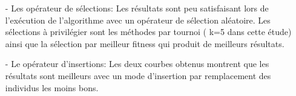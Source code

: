 \documentclass{article}
\begin{document}
\begin{itemize}
\item[-] Les  opérateur de sélections:
Les résultats sont peu satisfaisant lors de l'exécution de l'algorithme avec un opérateur de sélection aléatoire. Les sélections à privilégier sont les méthodes par tournoi ( k=5 dans cette étude) ainsi que la sélection par meilleur fitness qui produit de meilleurs résultats.

\item[-] Le opérateur d'insertions:
Les deux courbes obtenus montrent que les résultats sont meilleurs avec un mode d'insertion par remplacement des individus les moins bons.

\end{itemize}
\end{document}
